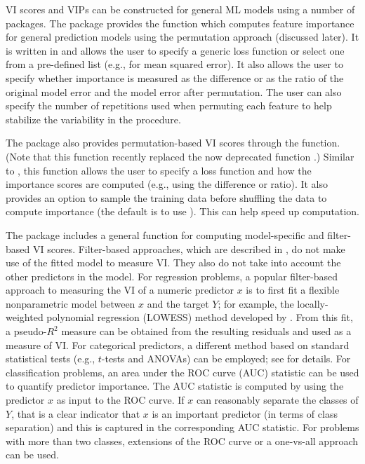 VI scores and VIPs can be constructed for general ML models using a number of packages. The  package \citep{iml-pkg} provides the  function which computes feature importance for general prediction models using the permutation approach (discussed later). It is written in  \citep{R6-pkg} and allows the user to specify a generic loss function or select one from a pre-defined list (e.g.,  for mean squared error). It also allows the user to specify whether importance is measured as the difference or as the ratio of the original model error and the model error after permutation. The user can also specify the number of repetitions used when permuting each feature to help stabilize the variability in the procedure.

The  package \citep{ingredients-pkg} also provides permutation-based VI scores through the  function. (Note that this function recently replaced the now deprecated  function  \citep{DALEX-pkg}.) Similar to , this function allows the user to specify a loss function and how the importance scores are computed (e.g., using the difference or ratio). It also provides an option to sample the training data before shuffling the data to compute importance (the default is to use ). This can help speed up computation.

The  package \citep{caret-pkg} includes a general  function for computing model-specific and filter-based VI scores. Filter-based approaches, which are described in \citet{applied-kuhn-2013}, do not make use of the fitted model to measure VI. They also do not take into account the other predictors in the model. For regression problems, a popular filter-based approach to measuring the VI of a numeric predictor $x$ is to first fit a flexible nonparametric model between $x$ and the target $Y$; for example, the locally-weighted polynomial regression (LOWESS) method developed by \citet{robust-cleveland-1979}. From this fit, a pseudo-$R^2$ measure can be obtained from the resulting residuals and used as a measure of VI. For categorical predictors, a different method based on standard statistical tests (e.g., $t$-tests and ANOVAs) can be employed; see \citet{applied-kuhn-2013} for details. For classification problems, an area under the ROC curve (AUC) statistic can be used to quantify predictor importance. The AUC statistic is computed by using the predictor $x$ as input to the ROC curve. If $x$ can reasonably separate the classes of $Y$, that is a clear indicator that $x$ is an important predictor (in terms of class separation) and this is captured in the corresponding AUC statistic. For problems with more than two classes, extensions of the ROC curve or a one-vs-all approach can be used.

